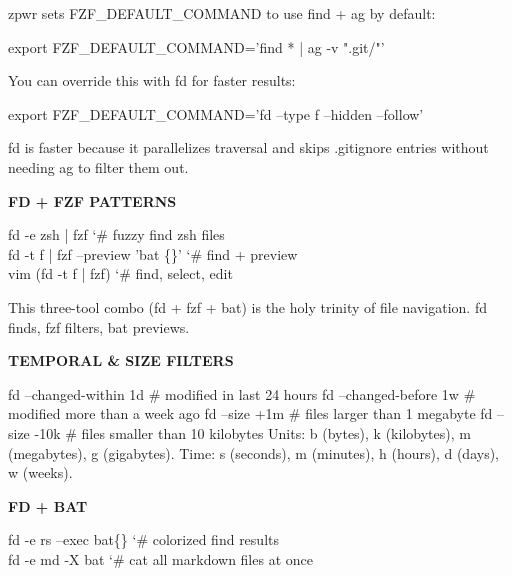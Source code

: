 \documentclass[11pt,a4paper,twoside]{book}
\begin{document}
zpwr sets FZF\_DEFAULT\_COMMAND to use find + ag by default:

\begin{codebox}
\color{neongreen}export FZF\_DEFAULT\_COMMAND='find * | ag -v ".git/"'\\
\end{codebox}

You can override this with fd for faster results:

\begin{codebox}
\color{neongreen}export FZF\_DEFAULT\_COMMAND='fd --type f --hidden --follow'\\
\end{codebox}

fd is faster because it parallelizes traversal and skips .gitignore entries without needing ag to filter them out.


\vspace{12pt}
{\bfseries\color{neonyellow} FD + FZF PATTERNS}\vspace{4pt}

\begin{codebox}
\color{neongreen}fd -e zsh | fzf                 {\char`\#} fuzzy find zsh files\\
\color{neongreen}fd -t f | fzf --preview 'bat \{\}'  {\char`\#} find + preview\\
\color{neongreen}vim (fd -t f | fzf)             {\char`\#} find, select, edit\\
\end{codebox}

This three-tool combo (fd + fzf + bat) is the holy trinity of file navigation. fd finds, fzf filters, bat previews.


\vspace{12pt}
{\bfseries\color{neonyellow} TEMPORAL \& SIZE FILTERS}\vspace{4pt}

fd --changed-within 1d  \# modified in last 24 hours fd --changed-before 1w  \# modified more than a week ago fd --size +1m           \# files larger than 1 megabyte fd --size -10k          \# files smaller than 10 kilobytes Units: b (bytes), k (kilobytes), m (megabytes), g (gigabytes). Time: s (seconds), m (minutes), h (hours), d (days), w (weeks).


\vspace{12pt}
{\bfseries\color{neonyellow} FD + BAT}\vspace{4pt}

\begin{codebox}
\color{neongreen}fd -e rs --exec bat\{\}   {\char`\#} colorized find results\\
\color{neongreen}fd -e md -X bat          {\char`\#} cat all markdown files at once\\
\end{codebox}
\end{document}
